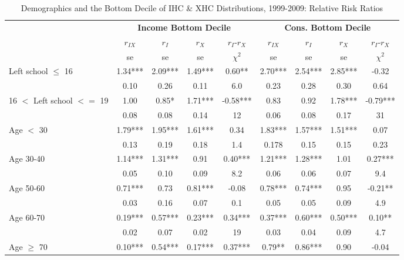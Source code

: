 \begin{table}
\caption{Demographics and the Bottom Decile of IHC \& XHC Distributions, 1999-2009: Relative Risk Ratios}
\centering
\begin{tabular}{l|cccc|cccc}
\hline\hline 
	& \multicolumn{4}{c}{\textbf{Income Bottom Decile}} &  \multicolumn{4}{c}{\textbf{Cons. Bottom Decile}} \\
	&	$r_{IX}$	&	$r_{I}$	&	$r_{X}$ &	$r_{I}$-$r_{X}$&	$r_{IX}$	&	$r_{I}$	&	$r_{X}$	&	$r_{I}$-$r_{X}$\\
  & se & se & se  & $\chi^{2}$ & se & se & se & $\chi^{2}$ \\
\hline
Left school $\leq$ 16	&	       1.34***  	&	       2.09***	&	      1.49***	&	0.60**	&	     					  2.70***	&	       2.54***	&	2.85***	&	-0.32	\\
                   		 	&	       0.10  	&	0.26	&	0.11	&	6.0	&	      
						 0.23   	&	0.28	&	0.30	&	0.64	\\
16 $<$ Left school $<=$ 19	&	       1.00   	&	       0.85*  	&	1.71***	&	-0.58***	&	
				       0.83   	&	       0.92  	&	       1.78***  	&	-0.79***	\\
                    		&	       0.08   	&	0.08	&	0.14	&	12	&	     
					  0.06   	&	0.08	&	0.17	&	31	\\
Age $<$ 30	&	       1.79*** 	&	       1.95***  	&	1.61***	&	0.34	&	
			       1.83***  	&	1.57***	&	1.51***	&	0.07	\\
                    	&	       0.13   	&	0.19	&	0.18	&	1.4	&	  
			     0.178  	&	0.15	&	0.15	&	0.23	\\
Age 30-40	&	      1.14***   	&	       1.31***	&	       0.91	&	0.40***	&	
			       1.21***   	&	       1.28***	&	1.01	&	0.27***	\\
                    	&	       0.05   	&	0.10	&	0.09	&	8.2	&	  
			     0.06 	&	0.06	&	0.07	&	9.4	\\
Age 50-60	&	       0.71***	&	       0.73	&	0.81***	&	-0.08	&
			       0.78***	&	       0.74***	&	       0.95 	&	-0.21**	\\
                    	&	       0.03   	&	0.16	&	0.07	&	0.1	&	
			       0.05   	&	0.05	&	0.09	&	4.9	\\
Age 60-70	&	       0.19***	&	       0.57***	&	       0.23***	&	0.34***	&	       								0.37***	&	       0.60***	&	0.50***	& 0.10**	\\
                    	&	       0.02   	&	0.07	&	0.02	&	19	&	
			       0.03   	&	0.04	&	0.09	&	4.7	\\
Age $\geq$ 70	&	       0.10***	&	       0.54***	&	       0.17***	&	0.37***	&	    					   		0.79**	&	       0.86***	&	      0.90 	&	-0.04	\\

\end{tabular}
\end{table}
